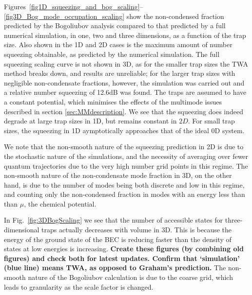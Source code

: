 \documentclass{iopart}
\begin{document}
Figures~\ref{fig1D_squeezing_and_bog_scaling}--\ref{fig3D_Bog_mode_occupation_scaling} show the non-condensed fraction predicted by the Bogoliubov analysis compared to that predicted by a full numerical simulation, in one, two and three dimensions, as a function of the trap size. Also shown in the 1D and 2D cases is the maximum amount of number squeezing obtainable, as predicted by the numerical simulation. The full squeezing scaling curve is not shown in 3D, as for the smaller trap sizes the TWA method breaks down, and results are unreliable; for the larger trap sizes with negligible non-condensate fractions, however, the simulation was carried out and a relative number squeezing of 12.6dB was found. The traps are assumed to have a constant potential, which minimises the effects of the multimode issues described in section \ref{sec:MMdescription}.  We see that the squeezing does indeed degrade at large trap sizes in 1D, but remains constant in $2D$. For small trap sizes, the squeezing in 1D aymptotically approaches that of the ideal 0D system.

We note that the non-smooth nature of the squeezing prediction in 2D is due to the stochastic nature of the simulations, and the necessity of averaging over fewer quantum trajectories due to the very high number grid points in this regime. The non-smooth nature of the non-condensate mode fraction in 3D, on the other hand, is due to the number of modes being both discrete and low in this regime, and counting only the non-condensed fraction in modes with an energy less than than $\mu$, the chemical potential.

In Fig.~\ref{fig:3DBogScaling} we see that the number of accessible states for three-dimensional traps actually decreases with volume in 3D. This is because the energy of the ground state of the BEC is reducing faster than the density of states at low energies is increasing.  \textbf{Create these figures (by combining old figures) and check both for latest updates.  Confirm that `simulation' (blue line) means TWA, as opposed to Graham's prediction.}  The non-smooth nature of the Bogoliubov calculation is due to the coarse grid, which leads to granularity as the scale factor is changed.  


\end{document}
